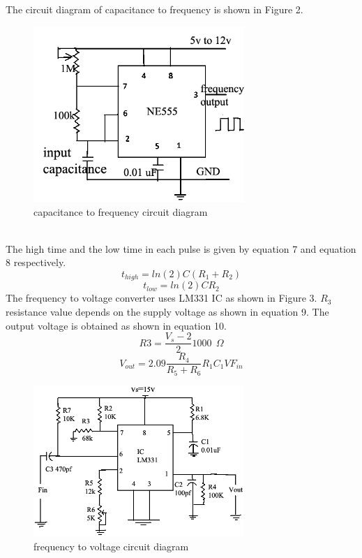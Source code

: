 \documentclass[conference]{IEEEtran}
\begin{document}
The circuit diagram of capacitance to frequency is shown in Figure 2.
\begin{figure}[h]
\includegraphics[width=8cm]{ctof.png}
\centering
\caption{capacitance to frequency circuit diagram}\label{Fig2}
\end{figure}
\\The high time and the low time in each pulse is given by equation 7 and equation 8 respectively.\\
\begin{equation} \label{eq:7}
t_{high}= ln(2)C(R_1+R_2)                    
\end{equation}
\begin{equation} \label{eq:8}
t_{low}= ln(2)CR_2                          
\end{equation}
The frequency to voltage converter uses LM331 IC as shown in Figure 3. $R_3$ resistance value depends on the supply voltage as shown in equation 9. The output voltage is obtained as shown in equation 10.\\

\begin{equation} \label{eq:9}
 R3= \frac{V_s-2}{2}1000\ \ \Omega           
 \end{equation}               
\begin{equation} \label{eq:10}
V_{out} = 2.09\frac{R_4}{R_5+R_6}R_1C_1VF_{in}  
\end{equation}            
\begin{figure}[h]
\includegraphics[width=8cm]{ftov.png}
\centering
\caption{frequency to voltage circuit diagram}\label{Fig3}
\end{figure}
\end{document}
